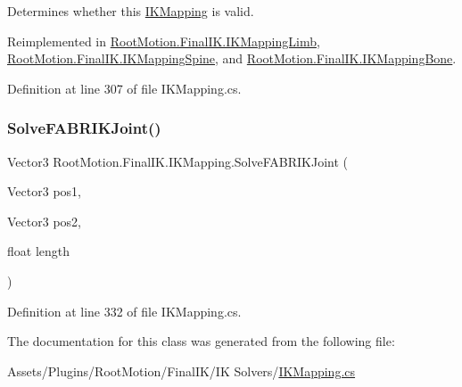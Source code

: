 Determines whether this \mbox{\hyperlink{class_root_motion_1_1_final_i_k_1_1_i_k_mapping}{I\+K\+Mapping}} is valid. 



Reimplemented in \mbox{\hyperlink{class_root_motion_1_1_final_i_k_1_1_i_k_mapping_limb_a9c62050a36b238ef19332f8855fdb6e4}{Root\+Motion.\+Final\+I\+K.\+I\+K\+Mapping\+Limb}}, \mbox{\hyperlink{class_root_motion_1_1_final_i_k_1_1_i_k_mapping_spine_ab93a1e51b71ee23679b83bd407976f9d}{Root\+Motion.\+Final\+I\+K.\+I\+K\+Mapping\+Spine}}, and \mbox{\hyperlink{class_root_motion_1_1_final_i_k_1_1_i_k_mapping_bone_ae6cdd8926b914a52dcef66e131733bd3}{Root\+Motion.\+Final\+I\+K.\+I\+K\+Mapping\+Bone}}.



Definition at line 307 of file I\+K\+Mapping.\+cs.

\mbox{\label{class_root_motion_1_1_final_i_k_1_1_i_k_mapping_a8033dee3f08c43f5e9d43c7cac83043f}} 
\subsubsection{\texorpdfstring{Solve\+F\+A\+B\+R\+I\+K\+Joint()}{SolveFABRIKJoint()}}
{\footnotesize\ttfamily Vector3 Root\+Motion.\+Final\+I\+K.\+I\+K\+Mapping.\+Solve\+F\+A\+B\+R\+I\+K\+Joint (\begin{DoxyParamCaption}\item[{Vector3}]{pos1,  }\item[{Vector3}]{pos2,  }\item[{float}]{length }\end{DoxyParamCaption})\hspace{0.3cm}{\ttfamily [protected]}}



Definition at line 332 of file I\+K\+Mapping.\+cs.



The documentation for this class was generated from the following file\+:\begin{DoxyCompactItemize}
\item 
Assets/\+Plugins/\+Root\+Motion/\+Final\+I\+K/\+I\+K Solvers/\mbox{\hyperlink{_i_k_mapping_8cs}{I\+K\+Mapping.\+cs}}\end{DoxyCompactItemize}
